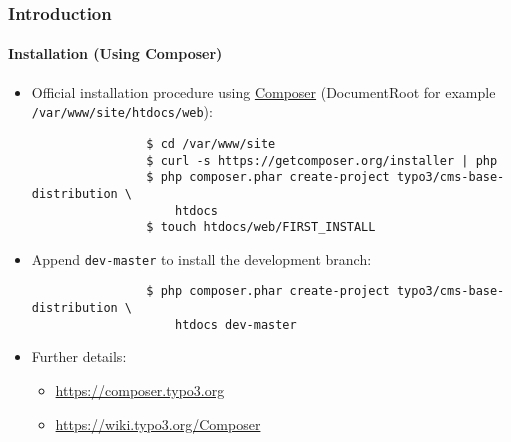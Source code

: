 \begin{frame}[fragile]
	\frametitle{Introduction}
	\framesubtitle{Installation (Using Composer)}

	\begin{itemize}

		\item Official installation procedure using \href{https://getcomposer.org/}{Composer}\newline
			(DocumentRoot for example \texttt{/var/www/site/htdocs/web}):

			\begin{lstlisting}
				$ cd /var/www/site
				$ curl -s https://getcomposer.org/installer | php
				$ php composer.phar create-project typo3/cms-base-distribution \
				    htdocs
				$ touch htdocs/web/FIRST_INSTALL
			\end{lstlisting}

		\item Append \texttt{dev-master} to install the development branch:

			\begin{lstlisting}
				$ php composer.phar create-project typo3/cms-base-distribution \
				    htdocs dev-master
			\end{lstlisting}

		\item Further details:

			\begin{itemize}
				\item \url{https://composer.typo3.org}
				\item \url{https://wiki.typo3.org/Composer}
			\end{itemize}

	\end{itemize}

\end{frame}

